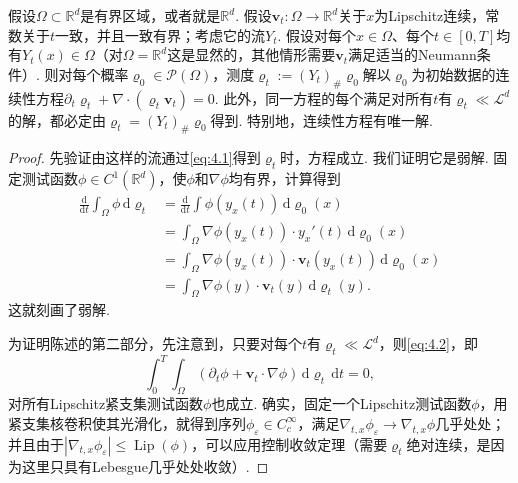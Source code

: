\begin{theorem}\label{obj:4.4}
假设$\Omega\subset\mathbb R^d$是有界区域，或者就是$\mathbb R^d$. 假设$\mathbf v_t:\Omega\to\mathbb R^d$关于$x$为Lipschitz连续，常数关于$t$一致，并且一致有界；考虑它的流$Y_t$. 假设对每个$x\in\Omega$、每个$t\in[0,T]$均有$Y_t(x)\in\Omega$（对$\Omega=\mathbb R^d$这是显然的，其他情形需要$\mathbf v_t$满足适当的Neumann条件）. 则对每个概率$\varrho_0\in\mathscr P(\Omega)$，测度$\varrho_t:=(Y_t)_\#\varrho_0$解以$\varrho_0$为初始数据的连续性方程$\partial_t\varrho_t+\nabla\cdot(\varrho_t\mathbf v_t)=0$. 此外，同一方程的每个满足对所有$t$有$\varrho_t\ll\mathscr L^d$的解，都必定由$\varrho_t=(Y_t)_\#\varrho_0$得到. 特别地，连续性方程有唯一解.
\end{theorem}
\begin{proof}
先验证由这样的流通过\eqref{eq:4.1}得到$\varrho_t$时，方程成立. 我们证明它是弱解. 固定测试函数$\phi\in C^1(\mathbb R^d)$，使$\phi$和$\nabla\phi$均有界，计算得到
\begin{equation*}
\begin{aligned}
 \frac{\mathrm d}{\mathrm dt}\int_\Omega\phi\,\mathrm d\varrho_t
 &=\frac{\mathrm d}{\mathrm dt}\int\phi(y_x(t))\,\mathrm d\varrho_0(x)\\
 &=\int_\Omega\nabla\phi(y_x(t))\cdot y_x'(t)\,\mathrm d\varrho_0(x)\\
 &=\int_\Omega\nabla\phi(y_x(t))\cdot\mathbf v_t(y_x(t))\,\mathrm d\varrho_0(x)\\
 &=\int_\Omega\nabla\phi(y)\cdot\mathbf v_t(y)\,\mathrm d\varrho_t(y).
\end{aligned}
\end{equation*}
这就刻画了弱解.

为证明陈述的第二部分，先注意到，只要对每个$t$有$\varrho_t\ll\mathscr L^d$，则\eqref{eq:4.2}，即
\[
 \int_0^T\int_\Omega(\partial_t\phi+\mathbf v_t\cdot\nabla\phi)
                    \,\mathrm d\varrho_t\,\mathrm dt=0,
\]
对所有Lipschitz紧支集测试函数$\phi$也成立. 确实，固定一个Lipschitz测试函数$\phi$，用紧支集核卷积使其光滑化，就得到序列$\phi_\varepsilon\in C_c^\infty$，满足$\nabla_{t,x}\phi_\varepsilon\to\nabla_{t,x}\phi$几乎处处；并且由于$|\nabla_{t,x}\phi_\varepsilon|\leq\operatorname{Lip}(\phi)$，可以应用控制收敛定理（需要$\varrho_t$绝对连续，是因为这里只具有Lebesgue几乎处处收敛）.


\end{proof}

